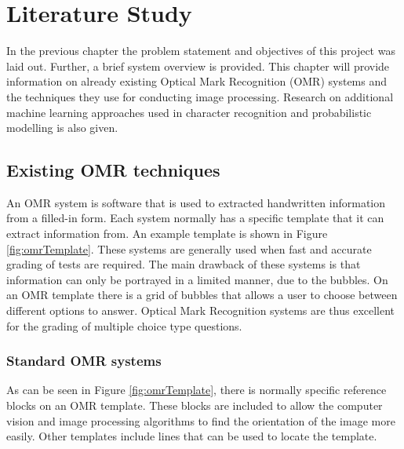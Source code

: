 \chapter{Literature Study}
\label{ch:LiteratureStudy}
\graphicspath{{Chapter2/Chapter2Figures/}}

In the previous chapter the problem statement and objectives of this project was laid out. Further, a brief system overview is provided.
This chapter will provide information on already existing Optical Mark Recognition (OMR) systems and the techniques they use for conducting image processing. Research on additional machine learning approaches used in character recognition and probabilistic modelling is also given.

\section{Existing OMR techniques}
An OMR system is software that is used to extracted handwritten information from a filled-in form. Each system normally has a specific template that it can extract information from. An example template is shown in Figure \ref{fig:omrTemplate}. These systems are generally used when fast and accurate grading of tests are required. The main drawback of these systems is that information can only be portrayed in a limited manner, due to the bubbles. On an OMR template there is a grid of bubbles that allows a user to choose between different options to answer. Optical Mark Recognition systems are thus excellent for the grading of multiple choice type questions. 

\subsection{Standard OMR systems}
\label{sec:StandardTech}

As can be seen in Figure \ref{fig:omrTemplate}, there is normally specific reference blocks on an OMR template. These blocks are included to allow the computer vision and image processing algorithms to find the orientation of the image more easily. Other templates include lines that can be used to locate the template.

